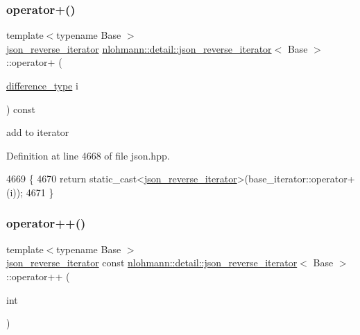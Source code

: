 \subsubsection{\texorpdfstring{operator+()}{operator+()}}
{\footnotesize\ttfamily template$<$typename Base $>$ \\
\hyperlink{classnlohmann_1_1detail_1_1json__reverse__iterator}{json\+\_\+reverse\+\_\+iterator} \hyperlink{classnlohmann_1_1detail_1_1json__reverse__iterator}{nlohmann\+::detail\+::json\+\_\+reverse\+\_\+iterator}$<$ Base $>$\+::operator+ (\begin{DoxyParamCaption}\item[{\hyperlink{classnlohmann_1_1detail_1_1json__reverse__iterator_a9ab55987c05ec6427ad36082e351cc45}{difference\+\_\+type}}]{i }\end{DoxyParamCaption}) const\hspace{0.3cm}{\ttfamily [inline]}}



add to iterator 



Definition at line 4668 of file json.\+hpp.


\begin{DoxyCode}
4669     \{
4670         \textcolor{keywordflow}{return} \textcolor{keyword}{static\_cast<}\hyperlink{classnlohmann_1_1detail_1_1json__reverse__iterator_a0246de16ece16293f2917dfa5d96e278}{json\_reverse\_iterator}\textcolor{keyword}{>}(base\_iterator::operator+(i));
4671     \}
\end{DoxyCode}
\mbox{\label{classnlohmann_1_1detail_1_1json__reverse__iterator_aada9d2b320002ef870c5283cda2c1e9d}} 
\subsubsection{\texorpdfstring{operator++()}{operator++()}\hspace{0.1cm}{\footnotesize\ttfamily [1/2]}}
{\footnotesize\ttfamily template$<$typename Base $>$ \\
\hyperlink{classnlohmann_1_1detail_1_1json__reverse__iterator}{json\+\_\+reverse\+\_\+iterator} const \hyperlink{classnlohmann_1_1detail_1_1json__reverse__iterator}{nlohmann\+::detail\+::json\+\_\+reverse\+\_\+iterator}$<$ Base $>$\+::operator++ (\begin{DoxyParamCaption}\item[{int}]{ }\end{DoxyParamCaption})\hspace{0.3cm}{\ttfamily [inline]}}



